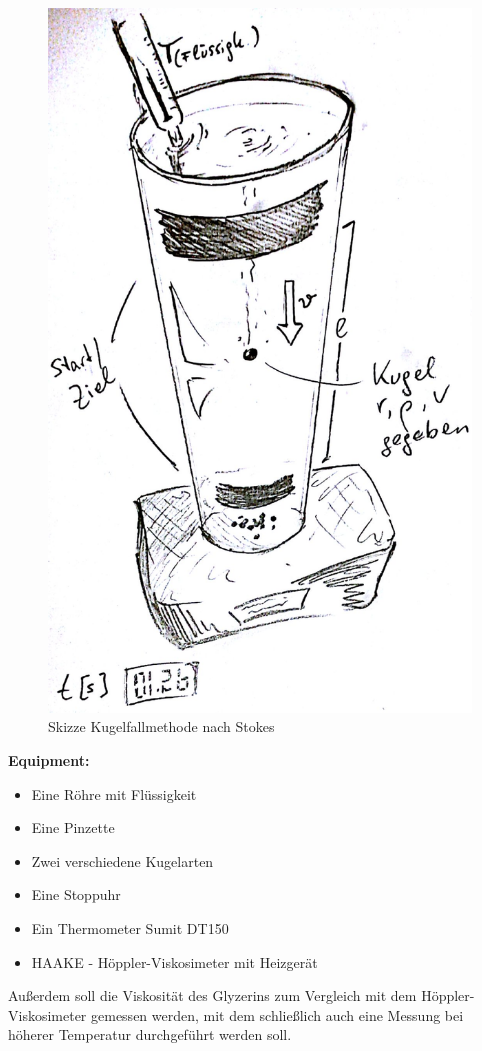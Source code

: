 \documentclass[12pt,a4paper]{article}
\begin{document}
\begin{multicols}{2}
\begin{figure}[H]
	\includegraphics[scale=0.15]{./figure/stokes.png}
	\caption{Skizze Kugelfallmethode nach Stokes}
	\label{fig:visko_aufbau}
\end{figure}

\textbf{Equipment:}\\
\begin{itemize}
	\item Eine Röhre mit Flüssigkeit
	\item Eine Pinzette
	\item Zwei verschiedene Kugelarten
	\item Eine Stoppuhr
	\item Ein Thermometer Sumit DT150
	\item HAAKE - Höppler-Viskosimeter mit Heizgerät
\end{itemize}
\noindent
Außerdem soll die Viskosität des Glyzerins zum Vergleich mit dem Höppler-Viskosimeter gemessen werden, mit dem schließlich auch eine Messung bei höherer Temperatur durchgeführt werden soll.




\end{multicols}
\end{document}
